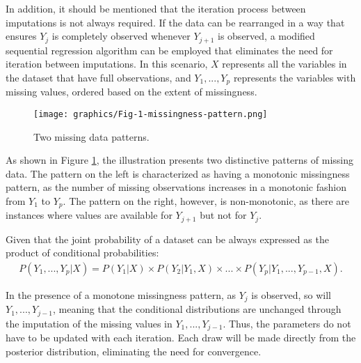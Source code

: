 In addition, it should be mentioned that the iteration process between imputations is not always required. If the data can be rearranged in a way that ensures $Y_j$ is completely observed whenever $Y_{j+1}$ is observed, a modified sequential regression algorithm can be employed that eliminates the need for iteration between imputations. In this scenario, $X$ represents all the variables in the dataset that have full observations, and $Y_1,...,Y_p$ represents the variables with missing values, ordered based on the extent of missingness. 
\begin{figure}[H]
    \centering
    \texttt{[image: graphics/Fig-1-missingness-pattern.png]}    
    \caption{Two missing data patterns.}
    \label{fig:missingpatterns}
\end{figure}

As shown in Figure \ref{fig:missingpatterns}, the illustration presents two distinctive patterns of missing data. The pattern on the left is characterized as having a monotonic missingness pattern, as the number of missing observations increases in a monotonic fashion from $Y_1$ to $Y_p$. The pattern on the right, however, is non-monotonic, as there are instances where values are available for $Y_{j+1}$ but not for $Y_j$.

Given that the joint probability of a dataset can be always expressed as the product of conditional probabilities:
\begin{align}
\label{equ:jointdis}
  P(Y_1,...,Y_p|X)=P(Y_1|X)\times P(Y_2|Y_1,X)\times ... \times P(Y_p|Y_1,...,Y_{p-1},X).
\end{align}

In the presence of a monotone missingness pattern, as $Y_j$ is observed, so will $Y_1,...,Y_{j−1}$, meaning that the conditional distributions are unchanged through the imputation of the missing values in $Y_1,...,Y_{j−1}$. Thus, the parameters do not have to be updated with each iteration. Each draw will be made directly from the posterior distribution, eliminating the need for convergence.

